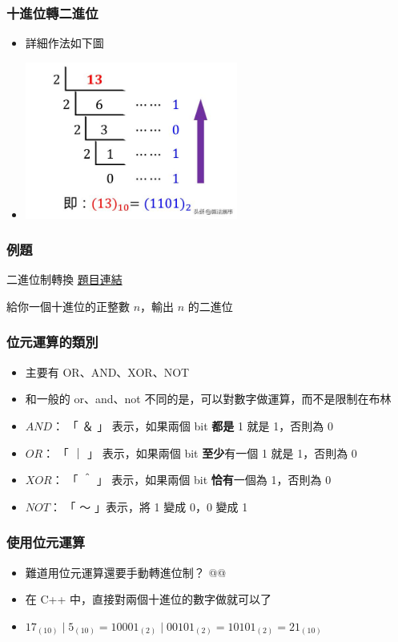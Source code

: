 \documentclass{beamer}
\begin{document}
\begin{frame}
    \frametitle{十進位轉二進位}
    \begin{itemize}
        \item 詳細作法如下圖
        \item \includegraphics[width=7.0cm]{img/img_1.png}
    \end{itemize}
\end{frame}

\begin{frame}
    \frametitle{例題}
    \begin{block}{二進位制轉換}
        \href{https://zerojudge.tw/ShowProblem?problemid=a034}{題目連結}

        給你一個十進位的正整數 $n$，輸出 $n$ 的二進位
    \end{block}
\end{frame}

\begin{frame}
    \frametitle{位元運算的類別}
    \begin{itemize}
        \item 主要有 OR、AND、XOR、NOT
        \item 和一般的 or、and、not 不同的是，可以對數字做運算，而不是限制在布林
        \vspace{0.5cm}
        \item<2-> $AND$： 「 ＆ 」 表示，如果兩個 bit \textbf{都是} 1 就是 1，否則為 0
        \item<2-> $OR$： 「 ｜ 」 表示，如果兩個 bit \textbf{至少}有一個 1 就是 1，否則為 0
        \item<2-> $XOR$： 「 ＾ 」 表示，如果兩個 bit \textbf{恰有}一個為 1，否則為 0
        \item<2-> $NOT$： 「 ～ 」表示，將 1 變成 0，0 變成 1
    \end{itemize}
\end{frame}

\begin{frame}
    \frametitle{使用位元運算}
    \begin{itemize}
        \item 難道用位元運算還要手動轉進位制？ @@
        \item<2-> 在 C++ 中，直接對兩個十進位的數字做就可以了
        \item<2-> $17_{(10)} \mid 5_{(10)} = 10001_{(2)} \mid 00101_{(2)} = 10101_{(2)} = 21_{(10)}$
    \end{itemize}
\end{frame}
\end{document}
